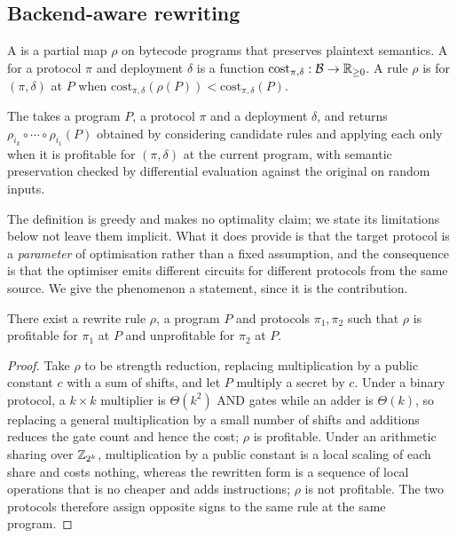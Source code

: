 \subsection{Backend-aware rewriting}
\label{sec:compiler:rewrite}

\begin{definition}
\label{def:rewrite}
A  is a partial map $\rho$ on bytecode programs that preserves
plaintext semantics. A  for a protocol $\pi$ and deployment
$\delta$ is a function $\mathrm{cost}_{\pi,\delta} : \mathcal{B} \to \mathbb{R}_{\ge0}$.
A rule $\rho$ is  for $(\pi,\delta)$ at $P$ when
$\mathrm{cost}_{\pi,\delta}(\rho(P)) < \mathrm{cost}_{\pi,\delta}(P)$.
\end{definition}

\begin{definition}
\label{def:baopt}
The  takes a program $P$, a protocol $\pi$ and a
deployment $\delta$, and returns
$\rho_{i_k} \circ \cdots \circ \rho_{i_1}(P)$ obtained by considering candidate
rules and applying each only when it is profitable for $(\pi,\delta)$ at the
current program, with semantic preservation checked by differential evaluation
against the original on random inputs.
\end{definition}

The definition is greedy and makes no optimality claim; we state its limitations
below not leave them implicit. What it does provide is that the target
protocol is a \emph{parameter} of optimisation rather than a fixed assumption, and
the consequence is that the optimiser emits different circuits for different
protocols from the same source. We give the phenomenon a statement, since it is
the contribution.

\begin{proposition}
\label{prop:rewrite-sign}
There exist a rewrite rule $\rho$, a program $P$ and protocols $\pi_1,\pi_2$ such
that $\rho$ is profitable for $\pi_1$ at $P$ and unprofitable for $\pi_2$ at $P$.
\end{proposition}

\begin{proof}
Take $\rho$ to be strength reduction, replacing multiplication by a public
constant $c$ with a sum of shifts, and let $P$ multiply a secret by $c$. Under a
binary protocol, a $k\times k$ multiplier is $\Theta(k^2)$ AND gates while an
adder is $\Theta(k)$, so replacing a general multiplication by a small number of
shifts and additions reduces the gate count and hence the cost; $\rho$ is
profitable. Under an arithmetic sharing over $\mathbb{Z}_{2^k}$, multiplication by a
public constant is a local scaling of each share and costs nothing, whereas the
rewritten form is a sequence of local operations that is no cheaper and adds
instructions; $\rho$ is not profitable. The two protocols therefore assign
opposite signs to the same rule at the same program.
\end{proof}

